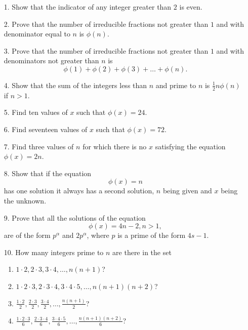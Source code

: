 \documentclass[oneside]{book}
\begin{document}
\small \begin{enumerate}
\item[1.] Show that the indicator of any integer greater than $2$
is even.

\item[2.] Prove that the number of irreducible fractions not greater
than $1$ and with denominator equal to $n$ is $\phi(n)$.

\item[3.] Prove that the number of irreducible fractions not greater
than $1$ and with denominators not greater than $n$ is
\begin{equation*}
\phi(1) + \phi(2) + \phi(3) + \ldots + \phi(n).
\end{equation*}

\item[4.] Show that the sum of the integers less than $n$ and prime to
$n$ is $\frac{1}{2} n \phi(n)$ if $n > 1$.

\item[5.] Find ten values of $x$ such that $\phi(x) = 24$.

\item[6.] Find seventeen values of $x$ such that $\phi(x) = 72$.

\item[7.] Find three values of $n$ for which there is no $x$ satisfying
the equation $\phi(x) = 2n$.

\item[8.] Show that if the equation
\begin{equation*}
\phi(x) = n
\end{equation*}
has one solution it always has a second solution, $n$ being given
and $x$ being the unknown.

\item[9.] Prove that all the solutions of the equation
\begin{equation*}
\phi(x) = 4n - 2, n > 1,
\end{equation*}
are of the form $p^\alpha$ and $2p^\alpha$, where $p$ is a prime of
the form $4s-1$.

\item[10.] How many integers prime to $n$ are there in the set
\begin{enumerate}
\item $1 \cdot 2, 2 \cdot 3, 3 \cdot 4, \ldots, n(n+1)$?
\item $1 \cdot 2 \cdot 3, 2 \cdot 3 \cdot 4,
   3 \cdot 4 \cdot 5, \ldots, n(n+1)(n+2)$?
\item $\frac{1 \cdot 2}{2}, \frac{2 \cdot 3}{2},
  \frac{3 \cdot 4}{2}, \ldots, \frac{n(n+1)}{2}$?
\item $\frac{1 \cdot 2 \cdot 3}{6},
  \frac{2 \cdot 3 \cdot 4}{6},
  \frac{3 \cdot 4 \cdot 5}{6},
  \ldots,
  \frac{n(n+1)(n+2)}{6}$?
\end{enumerate}


\end{enumerate}
\end{document}
